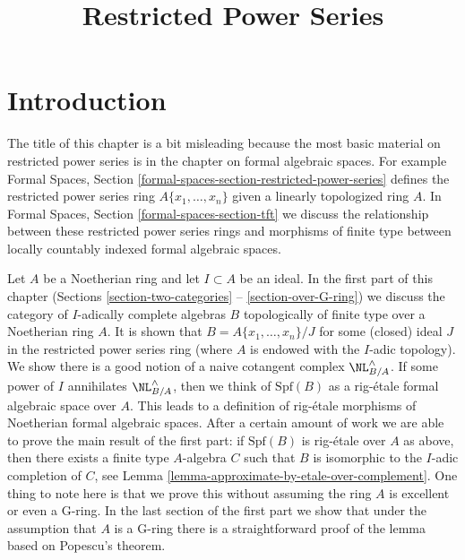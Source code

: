 

%


\title{Restricted Power Series}


\maketitle

\label{section-phantom}

\tableofcontents

\section{Introduction}
\label{section-introduction}

\noindent
The title of this chapter is a bit misleading because the most
basic material on restricted power series is in the chapter on
formal algebraic spaces. For example
Formal Spaces, Section \ref{formal-spaces-section-restricted-power-series}
defines the restricted power series ring $A\{x_1, \ldots, x_n\}$
given a linearly topologized ring $A$. In
Formal Spaces, Section \ref{formal-spaces-section-tft}
we discuss the relationship between these restricted power
series rings and morphisms of finite type between
locally countably indexed formal algebraic spaces.

\medskip\noindent
Let $A$ be a Noetherian ring and let $I \subset A$ be an ideal. In the
first part of this chapter
(Sections \ref{section-two-categories} -- \ref{section-over-G-ring})
we discuss the category of $I$-adically complete algebras $B$
topologically of finite type over a Noetherian ring $A$.
It is shown that $B = A\{x_1, \ldots, x_n\}/J$ for some
(closed) ideal $J$ in the restricted power series ring
(where $A$ is endowed with the $I$-adic topology).
We show there is a good notion of a naive cotangent complex
$\NL_{B/A}^\wedge$. If some power of $I$ annihilates
$\NL_{B/A}^\wedge$, then we think of $\text{Spf}(B)$ as
a rig-\'etale formal algebraic space over $A$. This leads to
a definition of rig-\'etale morphisms of Noetherian
formal algebraic spaces. After a certain amount of work
we are able to prove the main result of the first part:
if $\text{Spf}(B)$ is rig-\'etale over $A$ as above,
then there exists a finite type $A$-algebra $C$
such that $B$ is isomorphic to the $I$-adic completion of $C$, see
Lemma \ref{lemma-approximate-by-etale-over-complement}.
One thing to note here is that we prove this without assuming
the ring $A$ is excellent or even a G-ring. In the last section
of the first part we show that under the assumption that
$A$ is a G-ring there is a straightforward
proof of the lemma based on Popescu's theorem.

